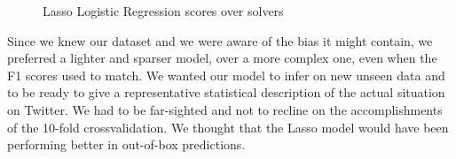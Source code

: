 \begin{figure}[htp!]
	\centering 
	\caption{Lasso Logistic Regression scores over solvers}
\end{figure}


Since we knew our dataset and we were aware of the bias it might contain, we preferred a lighter and sparser model, over a more complex one, even when the F1 scores used to match. We wanted our model to infer on new unseen data and to be ready to give a representative statistical description of the actual situation on Twitter.
We had to be far-sighted and not to recline on the accomplishments of the 10-fold crossvalidation. We thought that the Lasso model would have been performing better in out-of-box predictions.


